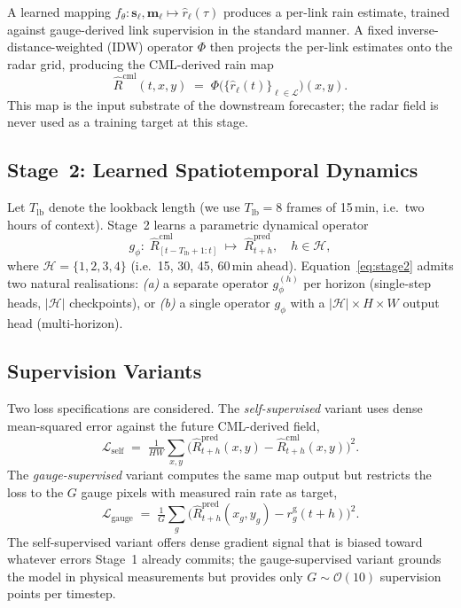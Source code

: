 \documentclass[conference]{IEEEtran}
\begin{document}
A learned mapping
$f_{\theta}:\mathbf{s}_\ell,\mathbf{m}_\ell \mapsto
\widehat{r}_\ell(\tau)$ produces a per-link rain estimate, trained
against gauge-derived link supervision in the standard manner. A fixed
inverse-distance-weighted (IDW) operator $\Phi$ then projects the
per-link estimates onto the radar grid, producing the CML-derived
rain map
\begin{equation}
  \widehat{R}^{\mathrm{cml}}(t,x,y) \;=\;
  \Phi\!\bigl(\{\widehat{r}_\ell(t)\}_{\ell\in\mathcal{L}}\bigr)(x,y).
\end{equation}
This map is the input substrate of the downstream forecaster; the radar
field is never used as a training target at this stage.

\subsection{Stage~2: Learned Spatiotemporal Dynamics}

Let $T_{\mathrm{lb}}$ denote the lookback length (we use
$T_{\mathrm{lb}}=8$ frames of 15\,min, i.e.~two hours of context).
Stage~2 learns a parametric dynamical operator
\begin{equation}
  g_{\phi}\colon\;
  \widehat{R}^{\mathrm{cml}}_{[t-T_{\mathrm{lb}}+1:t]}
  \;\longmapsto\;
  \widehat{R}^{\mathrm{pred}}_{t+h},
  \quad h\in\mathcal{H},
\label{eq:stage2}
\end{equation}
where $\mathcal{H}=\{1,2,3,4\}$ (i.e.~15, 30, 45, 60\,min ahead).
Equation~\eqref{eq:stage2} admits two natural realisations:
\emph{(a)} a separate operator $g_\phi^{(h)}$ per horizon (single-step
heads, $|\mathcal{H}|$ checkpoints), or \emph{(b)} a single operator
$g_\phi$ with a $|\mathcal{H}|\!\times\!H\!\times\!W$ output head
(multi-horizon).

\subsection{Supervision Variants}

Two loss specifications are considered. The \emph{self-supervised}
variant uses dense mean-squared error against the future CML-derived
field,
\begin{equation}
  \mathcal{L}_{\mathrm{self}} \;=\;
  \tfrac{1}{HW}\sum_{x,y}\bigl(
  \widehat{R}^{\mathrm{pred}}_{t+h}(x,y) - \widehat{R}^{\mathrm{cml}}_{t+h}(x,y)
  \bigr)^{2}.
\end{equation}
The \emph{gauge-supervised} variant computes the same map output but
restricts the loss to the $G$ gauge pixels with measured rain rate as
target,
\begin{equation}
  \mathcal{L}_{\mathrm{gauge}} \;=\;
  \tfrac{1}{G}\sum_{g}\bigl(
  \widehat{R}^{\mathrm{pred}}_{t+h}(x_g,y_g) - r^{\mathrm{g}}_g(t+h)
  \bigr)^{2}.
\end{equation}
The self-supervised variant offers dense gradient signal that is biased
toward whatever errors Stage~1 already commits; the gauge-supervised
variant grounds the model in physical measurements but provides only
$G\!\sim\!\mathcal{O}(10)$ supervision points per timestep.
\end{document}
